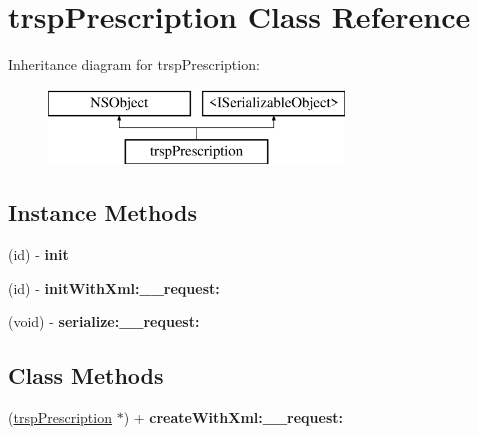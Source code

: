 \hypertarget{interfacetrsp_prescription}{}\section{trsp\+Prescription Class Reference}
\label{interfacetrsp_prescription}
Inheritance diagram for trsp\+Prescription\+:\begin{figure}[H]
\begin{center}
\leavevmode
\includegraphics[height=2.000000cm]{interfacetrsp_prescription}
\end{center}
\end{figure}
\subsection*{Instance Methods}
\begin{DoxyCompactItemize}
\item 
\hypertarget{interfacetrsp_prescription_a7c89c45eee1922a5d166ee03d2d20ace}{}(id) -\/ {\bfseries init}\label{interfacetrsp_prescription_a7c89c45eee1922a5d166ee03d2d20ace}

\item 
\hypertarget{interfacetrsp_prescription_ab0a31cb859579e661003dad37db5aebf}{}(id) -\/ {\bfseries init\+With\+Xml\+:\+\_\+\+\_\+request\+:}\label{interfacetrsp_prescription_ab0a31cb859579e661003dad37db5aebf}

\item 
\hypertarget{interfacetrsp_prescription_a400ae458c12b6f884d7882c99f622b27}{}(void) -\/ {\bfseries serialize\+:\+\_\+\+\_\+request\+:}\label{interfacetrsp_prescription_a400ae458c12b6f884d7882c99f622b27}

\end{DoxyCompactItemize}
\subsection*{Class Methods}
\begin{DoxyCompactItemize}
\item 
\hypertarget{interfacetrsp_prescription_a44147d7e54637f6e6751a214304aabf3}{}(\hyperlink{interfacetrsp_prescription}{trsp\+Prescription} $\ast$) + {\bfseries create\+With\+Xml\+:\+\_\+\+\_\+request\+:}\label{interfacetrsp_prescription_a44147d7e54637f6e6751a214304aabf3}

\end{DoxyCompactItemize}
